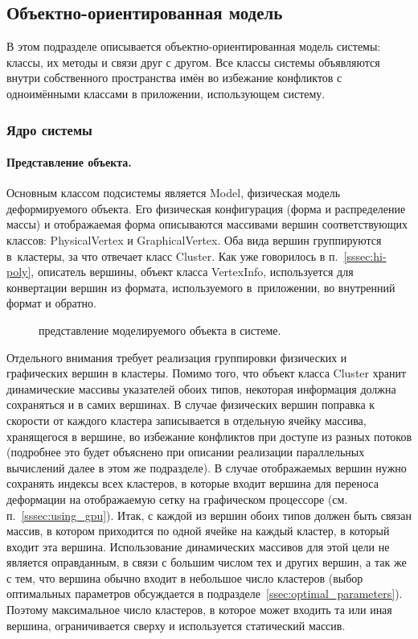 \documentclass[a4paper, 14pt, titlepage]{extarticle}
\newcommand{\includefigure}[3][]{
    \begin{figure}[!htb]
      \center{\texttt{[image: \#2]}}
      \caption{#3} \label{fig:#2}
    \end{figure}
  }
\begin{document}
    \subsection{Объектно-ориентированная модель}\label{ssec:impl}

      В этом подразделе описывается объектно-ориентированная модель системы: классы, их методы и
      связи друг с другом. Все классы системы объявляются внутри собственного пространства имён во
      избежание конфликтов с одноимёнными классами в приложении, использующем систему.

      \subsubsection{Ядро системы}\label{sssec:impl_core}

        \paragraph{Представление объекта.}
        Основным классом подсистемы является Model, физическая модель деформируемого объекта.
        Его физическая конфигурация (форма и распределение массы) и отображаемая форма описываются
        массивами вершин соответствующих классов: PhysicalVertex и GraphicalVertex. Оба вида вершин
        группируются в~кластеры, за что отвечает класс Cluster. Как уже говорилось в
        п.~\ref{sssec:hi-poly}, описатель вершины, объект класса VertexInfo, используется для
        конвертации вершин из формата, используемого в~приложении, во внутренний формат и обратно.

        \includefigure{core-vertices}{представление моделируемого объекта в системе.}

        Отдельного внимания требует реализация группировки физических и графических вершин в
        кластеры. Помимо того, что объект класса Cluster хранит динамические массивы указателей
        обоих типов, некоторая информация должна сохраняться и в самих вершинах. В случае физических
        вершин поправка к скорости от каждого кластера записывается в отдельную ячейку массива,
        хранящегося в вершине, во избежание конфликтов при доступе из разных потоков (подробнее это
        будет объяснено при описании реализации параллельных вычислений далее в этом же подразделе).
        В случае отображаемых вершин нужно сохранять индексы всех кластеров, в которые входит
        вершина для переноса деформации на отображаемую сетку на графическом процессоре (см.
        п.~\ref{sssec:using_gpu}). Итак, с каждой из вершин обоих типов должен быть связан массив, в
        котором приходится по одной ячейке на каждый кластер, в который входит эта вершина.
        Использование динамических массивов для этой цели не является оправданным, в связи с большим
        числом тех и других вершин, а так же с тем, что вершина обычно входит в небольшое число
        кластеров (выбор оптимальных параметров обсуждается в подразделе~\ref{ssec:optimal_parameters}). Поэтому
        максимальное число кластеров, в которое может входить та или иная вершина, ограничивается
        сверху и используется статический массив.
\end{document}
